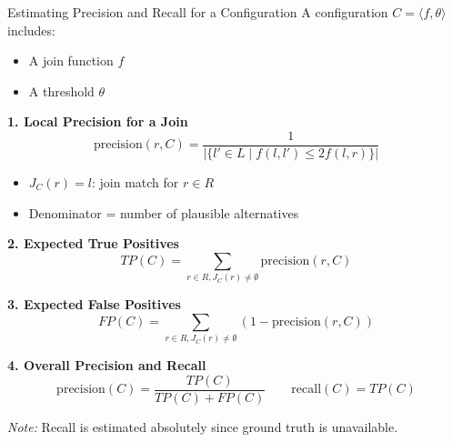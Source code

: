 \documentclass[8pt]{beamer} %
\begin{document}
	
\small	
\begin{frame}{Estimating Precision and Recall for a Configuration}
	A configuration $C = \langle f, \theta \rangle$ includes:
	\begin{itemize}
		\item A join function $f$
		\item A threshold $\theta$
	\end{itemize}
	
	\textbf{1. Local Precision for a Join}
	\[
	\text{precision}(r, C) =
	\frac{1}{
		|\{ l' \in L \mid f(l, l') \leq 2f(l, r) \}|
	}
	\]
	\begin{itemize}
		\item $J_C(r) = l$: join match for $r \in R$
		\item Denominator = number of plausible alternatives
	\end{itemize}
	
	\textbf{2. Expected True Positives}
	\[
	TP(C) = \sum_{r \in R, J_C(r) \neq \emptyset} \text{precision}(r, C)
	\]
	
	\textbf{3. Expected False Positives}
	\[
	FP(C) = \sum_{r \in R, J_C(r) \neq \emptyset} \left(1 - \text{precision}(r, C)\right)
	\]
	
	\textbf{4. Overall Precision and Recall}
	\[
	\text{precision}(C) = \frac{TP(C)}{TP(C) + FP(C)} \quad\quad
	\text{recall}(C) = TP(C)
	\]
	
	\textit{Note:} Recall is estimated absolutely since ground truth is unavailable.
\end{frame}
\end{document}
